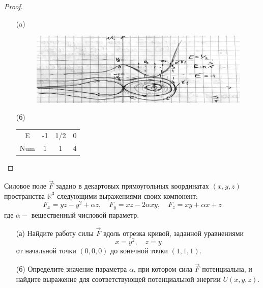 \begin{proof}
\begin{itemize}
\item[(a)]
\item[]
    \begin{figure}[h!]
    \includegraphics[scale=0.5]{IMG/prb_2v2}
    \end{figure}
\item[(б)]
    \begin{flushleft}
    \begin{tabular}{ c | c c c }
    E & -1 & 1/2 & 0\\
    Num & 1 & 1 & 4
    \end{tabular}
    \end{flushleft}
\end{itemize}
\end{proof}
\vskip 0.6in




\begin{prob}
Силовое поле $\vec{F}$ задано в декартовых прямоугольных координатах $(x, y, z)$ пространства $\mathbb{R}^3$ следующими выражениями своих компонент:
$$
F_x=y z-y^2+\alpha z, \quad F_y=x z-2 \alpha x y, \quad F_z=x y+\alpha x+z
$$
где $\alpha-$ вещественный числовой параметр.
\begin{itemize}
\item[(а)] Найдите работу силы $\vec{F}$ вдоль отрезка кривой, заданной уравнениями
$$
x=y^2, \quad z=y
$$
от начальной точки $\left(0,0,0\right)$ до конечной точки $\left(1,1,1\right)$.
\item[(б)] Определите значение параметра $\alpha$, при котором сила $\vec{F}$ потенциальна, и найдите выражение для соответствующей потенциальной энергии $U(x, y, z)$.
\end{itemize}
\end{prob}

